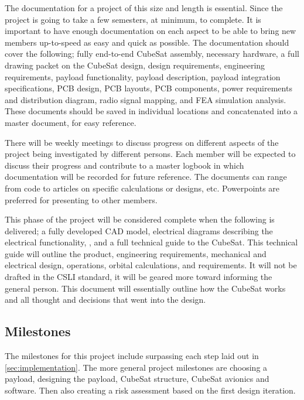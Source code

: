 \documentclass[conference]{IEEEtran} %
\begin{document}
The documentation for a project of this size and length is essential. Since the project is going to take a few semesters, at minimum, to complete. It is important
to have enough documentation on each aspect to be able to bring new members up-to-speed as easy and quick as possible. The documentation should cover the following; fully end-to-end CubeSat assembly,
necessary hardware, a full drawing packet on the CubeSat design, design requirements, engineering requirements, payload functionality, payload description, payload integration specifications, PCB design,
PCB layouts, PCB components, power requirements and distribution diagram, radio signal mapping, and FEA simulation analysis. These documents should be saved in individual locations
and concatenated into a master document, for easy reference.

There will be weekly meetings to discuss progress on different aspects of the project being investigated by different persons. Each member will be expected to discuss
their progress and contribute to a master logbook in which documentation will be recorded for future reference. The documents can range from code to articles on specific calculations
or designs, etc. Powerpoints are preferred for presenting to other members.

This phase of the project will be considered complete when the following is delivered; a fully developed CAD model, electrical diagrams describing the electrical functionality,
, and a full technical guide to the CubeSat. This technical guide will outline the product, engineering requirements, mechanical and electrical design, operations, orbital calculations, and
requirements. It will not be drafted in the CSLI standard, it will be geared more toward informing the general person. This document will essentially outline how the CubeSat works and all
thought and decisions that went into the design.

\subsection{Milestones}
\label{subsec:milestones}
The milestones for this project include surpassing each step laid out in \autoref{sec:implementation}. The more general project milestones are choosing a payload,
designing the payload, CubeSat structure, CubeSat avionics and software. Then also creating a risk assessment based on the first design iteration.
\end{document}
